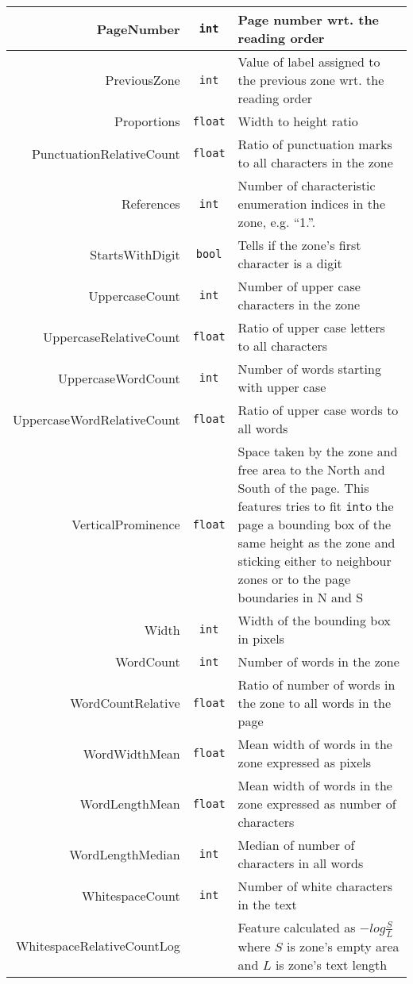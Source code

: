 \begin{appendices}
\begin{longtable}[c]{|r|c|p{8cm}|}
PageNumber & \verb+int+ & Page number wrt. the reading order \\ \hline
PreviousZone & \verb+int+ & Value of label assigned to the previous zone wrt. the reading order\\ \hline
Proportions & \verb+float+ & Width to height ratio\\ \hline
PunctuationRelativeCount & \verb+float+ & Ratio of punctuation marks to all characters in the zone\\ \hline
References & \verb+int+ & Number of characteristic enumeration indices in the zone, e.g. ``1.''.\\ \hline
StartsWithDigit & \verb+bool+ & Tells if the zone's first character is a digit\\ \hline
UppercaseCount & \verb+int+ & Number of upper case characters in the zone \\ \hline
UppercaseRelativeCount & \verb+float+ & Ratio of upper case letters to all characters\\ \hline
UppercaseWordCount & \verb+int+ & Number of words starting with upper case\\ \hline
UppercaseWordRelativeCount & \verb+float+ & Ratio of upper case words to all words\\ \hline
VerticalProminence & \verb+float+ & Space taken by the zone and free area to the North and South of the page. This features tries to fit \verb+int+o the page a bounding box of the same height as the zone and sticking either to neighbour zones or to the page boundaries in N and S \\ \hline
Width & \verb+int+ & Width of the bounding box in pixels\\ \hline
WordCount & \verb+int+ & Number of words in the zone\\ \hline
WordCountRelative & \verb+float+ & Ratio of number of words in the zone to all words in the page\\ \hline
WordWidthMean & \verb+float+ & Mean width of words in the zone expressed as pixels\\ \hline
WordLengthMean & \verb+float+ & Mean width of words in the zone expressed as number of characters\\ \hline
WordLengthMedian & \verb+int+ & Median of number of characters in all words \\ \hline
WhitespaceCount & \verb+int+ & Number of white characters in the text\\ \hline
WhitespaceRelativeCountLog & & Feature calculated as $-log \frac{S}{L}$ where $S$ is zone's empty area and $L$ is zone's text length \\ \hline

\end{longtable}
\end{appendices}
